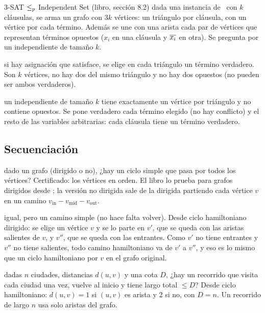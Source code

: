\begin{problema}{3-SAT $\le_{p}$ Independent Set (libro, sección 8.2)}
 dada una instancia de \npTSAT\ con $k$ cláusulas, se arma un grafo con $3k$ vértices: un triángulo por cláusula, con un vértice por cada término. Además se une con una arista cada par de vértices que representan términos opuestos ($x_i$ en una cláusula y $\overline{x_i}$ en otra). Se pregunta por un independiente de tamaño $k$.

 si hay asignación que satisface, se elige en cada triángulo un término verdadero. Son $k$ vértices, no hay dos del mismo triángulo y no hay dos opuestos (no pueden ser ambos verdaderos).

 un independiente de tamaño $k$ tiene exactamente un vértice por triángulo y no contiene opuestos. Se pone verdadero cada término elegido (no hay conflicto) y el resto de las variables arbitrarias: cada cláusula tiene un término verdadero.
\end{problema}

\subsection{Secuenciación}

 dado un grafo (dirigido o no), ¿hay un ciclo simple que pasa por todos los vértices? Certificado: los vértices en orden. El libro lo prueba para grafos dirigidos desde \npTSAT; la versión no dirigida sale de la dirigida partiendo cada vértice $v$ en un camino $v_{\text{in}}-v_{\text{mid}}-v_{\text{out}}$.

 igual, pero un camino simple (no hace falta volver). Desde ciclo hamiltoniano dirigido: se elige un vértice $v$ y se lo parte en $v'$, que se queda con las aristas salientes de $v$, y $v''$, que se queda con las entrantes. Como $v'$ no tiene entrantes y $v''$ no tiene salientes, todo camino hamiltoniano va de $v'$ a $v''$, y eso es lo mismo que un ciclo hamiltoniano por $v$ en el grafo original.

\npdato{\npTSP} dadas $n$ ciudades, distancias $d(u,v)$ y una cota $D$, ¿hay un recorrido que visita cada ciudad una vez, vuelve al inicio y tiene largo total $\le D$? Desde ciclo hamiltoniano: $d(u,v)=1$ si $(u,v)$ es arista y $2$ si no, con $D=n$. Un recorrido de largo $n$ usa solo aristas del grafo.

